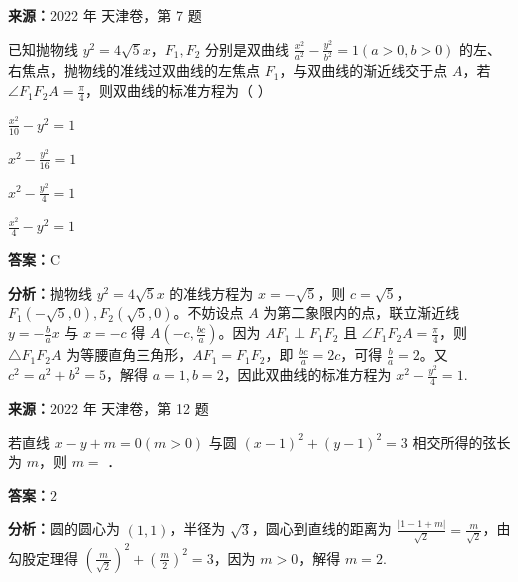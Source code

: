 \begin{question}[points=5]
\textbf{来源：}2022 年 天津卷，第 7 题\par
已知抛物线 $y^2=4\sqrt{5}x$，$F_1,F_2$ 分别是双曲线 $\frac{x^2}{a^2}-\frac{y^2}{b^2}=1(a>0,b>0)$ 的左、右焦点，抛物线的准线过双曲线的左焦点 $F_1$，与双曲线的渐近线交于点 $A$，若 $\angle F_1F_2A=\frac{\pi}{4}$，则双曲线的标准方程为（   ）
\begin{choices}
  \item $\frac{x^2}{10}-y^2=1$
  \item $x^2-\frac{y^2}{16}=1$
  \item $x^2-\frac{y^2}{4}=1$
  \item $\frac{x^2}{4}-y^2=1$
\end{choices}
\begin{solution}
\textbf{答案：}C

\textbf{分析：}抛物线 $y^2=4\sqrt{5}x$ 的准线方程为 $x=-\sqrt{5}$，则 $c=\sqrt{5}$，$F_1(-\sqrt{5},0),F_2(\sqrt{5},0)$。不妨设点 $A$ 为第二象限内的点，联立渐近线 $y=-\frac{b}{a}x$ 与 $x=-c$ 得 $A(-c,\frac{bc}{a})$。因为 $AF_1\perp F_1F_2$ 且 $\angle F_1F_2A=\frac{\pi}{4}$，则 $\triangle F_1F_2A$ 为等腰直角三角形，$AF_1=F_1F_2$，即 $\frac{bc}{a}=2c$，可得 $\frac{b}{a}=2$。又 $c^2=a^2+b^2=5$，解得 $a=1,b=2$，因此双曲线的标准方程为 $x^2-\frac{y^2}{4}=1$.
\end{solution}
\end{question}

\begin{question}[points=5]
\textbf{来源：}2022 年 天津卷，第 12 题\par
若直线 $x-y+m=0(m>0)$ 与圆 $(x-1)^2+(y-1)^2=3$ 相交所得的弦长为 $m$，则 $m=$ ．
\fillin[{$2$}]
\begin{solution}
\textbf{答案：}$2$

\textbf{分析：}圆的圆心为 $(1,1)$，半径为 $\sqrt{3}$，圆心到直线的距离为 $\frac{|1-1+m|}{\sqrt{2}}=\frac{m}{\sqrt{2}}$，由勾股定理得 $(\frac{m}{\sqrt{2}})^2+(\frac{m}{2})^2=3$，因为 $m>0$，解得 $m=2$.
\end{solution}
\end{question}

